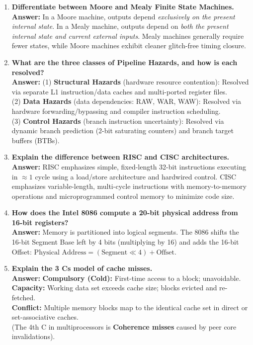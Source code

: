 \begin{enumerate}[label=\bfseries Q\arabic*.]
    \item \textbf{Differentiate between Moore and Mealy Finite State Machines.} \\
    \textbf{Answer:} In a Moore machine, outputs depend \textit{exclusively on the present internal state}. In a Mealy machine, outputs depend on \textit{both the present internal state and current external inputs}. Mealy machines generally require fewer states, while Moore machines exhibit cleaner glitch-free timing closure.

    \item \textbf{What are the three classes of Pipeline Hazards, and how is each resolved?} \\
    \textbf{Answer:}
    (1) \textbf{Structural Hazards} (hardware resource contention): Resolved via separate L1 instruction/data caches and multi-ported register files. \\
    (2) \textbf{Data Hazards} (data dependencies: RAW, WAR, WAW): Resolved via hardware forwarding/bypassing and compiler instruction scheduling. \\
    (3) \textbf{Control Hazards} (branch instruction uncertainty): Resolved via dynamic branch prediction (2-bit saturating counters) and branch target buffers (BTBs).

    \item \textbf{Explain the difference between RISC and CISC architectures.} \\
    \textbf{Answer:} RISC emphasizes simple, fixed-length 32-bit instructions executing in $\approx 1$ cycle using a load/store architecture and hardwired control. CISC emphasizes variable-length, multi-cycle instructions with memory-to-memory operations and microprogrammed control memory to minimize code size.

    \item \textbf{How does the Intel 8086 compute a 20-bit physical address from 16-bit registers?} \\
    \textbf{Answer:} Memory is partitioned into logical segments. The 8086 shifts the 16-bit Segment Base left by 4 bits (multiplying by 16) and adds the 16-bit Offset: $\text{Physical Address} = (\text{Segment} \ll 4) + \text{Offset}$.

    \item \textbf{Explain the 3 Cs model of cache misses.} \\
    \textbf{Answer:}
    \textbf{Compulsory (Cold):} First-time access to a block; unavoidable. \\
    \textbf{Capacity:} Working data set exceeds cache size; blocks evicted and re-fetched. \\
    \textbf{Conflict:} Multiple memory blocks map to the identical cache set in direct or set-associative caches. \\
    (The 4th C in multiprocessors is \textbf{Coherence misses} caused by peer core invalidations).


\end{enumerate}
